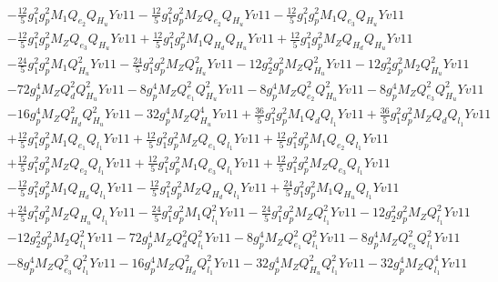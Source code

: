 \begin{align}
 &-\frac{12}{5} g_{1}^{2} g_{p}^{2} M_1 Q_{e_{2}} Q_{H_u} Yv11 -\frac{12}{5} g_{1}^{2} g_{p}^{2} M_Z Q_{e_{2}} Q_{H_u} Yv11 -\frac{12}{5} g_{1}^{2} g_{p}^{2} M_1 Q_{e_3} Q_{H_u} Yv11 \nonumber \\ 
 &-\frac{12}{5} g_{1}^{2} g_{p}^{2} M_Z Q_{e_3} Q_{H_u} Yv11 +\frac{12}{5} g_{1}^{2} g_{p}^{2} M_1 Q_{H_d} Q_{H_u} Yv11 +\frac{12}{5} g_{1}^{2} g_{p}^{2} M_Z Q_{H_d} Q_{H_u} Yv11 \nonumber \\ 
 &-\frac{24}{5} g_{1}^{2} g_{p}^{2} M_1 Q_{H_u}^{2} Yv11 -\frac{24}{5} g_{1}^{2} g_{p}^{2} M_Z Q_{H_u}^{2} Yv11 -12 g_{2}^{2} g_{p}^{2} M_Z Q_{H_u}^{2} Yv11 -12 g_{2}^{2} g_{p}^{2} M_2 Q_{H_u}^{2} Yv11 \nonumber \\ 
 &-72 g_{p}^{4} M_Z Q_{d}^{2} Q_{H_u}^{2} Yv11 -8 g_{p}^{4} M_Z Q_{e_{1}}^{2} Q_{H_u}^{2} Yv11 -8 g_{p}^{4} M_Z Q_{e_{2}}^{2} Q_{H_u}^{2} Yv11 -8 g_{p}^{4} M_Z Q_{e_3}^{2} Q_{H_u}^{2} Yv11 \nonumber \\ 
 &-16 g_{p}^{4} M_Z Q_{H_d}^{2} Q_{H_u}^{2} Yv11 -32 g_{p}^{4} M_Z Q_{H_u}^{4} Yv11 +\frac{36}{5} g_{1}^{2} g_{p}^{2} M_1 Q_{d} Q_{l_1} Yv11 +\frac{36}{5} g_{1}^{2} g_{p}^{2} M_Z Q_{d} Q_{l_1} Yv11 \nonumber \\ 
 &+\frac{12}{5} g_{1}^{2} g_{p}^{2} M_1 Q_{e_{1}} Q_{l_1} Yv11 +\frac{12}{5} g_{1}^{2} g_{p}^{2} M_Z Q_{e_{1}} Q_{l_1} Yv11 +\frac{12}{5} g_{1}^{2} g_{p}^{2} M_1 Q_{e_{2}} Q_{l_1} Yv11 \nonumber \\ 
 &+\frac{12}{5} g_{1}^{2} g_{p}^{2} M_Z Q_{e_{2}} Q_{l_1} Yv11 +\frac{12}{5} g_{1}^{2} g_{p}^{2} M_1 Q_{e_3} Q_{l_1} Yv11 +\frac{12}{5} g_{1}^{2} g_{p}^{2} M_Z Q_{e_3} Q_{l_1} Yv11 \nonumber \\ 
 &-\frac{12}{5} g_{1}^{2} g_{p}^{2} M_1 Q_{H_d} Q_{l_1} Yv11 -\frac{12}{5} g_{1}^{2} g_{p}^{2} M_Z Q_{H_d} Q_{l_1} Yv11 +\frac{24}{5} g_{1}^{2} g_{p}^{2} M_1 Q_{H_u} Q_{l_1} Yv11 \nonumber \\ 
 &+\frac{24}{5} g_{1}^{2} g_{p}^{2} M_Z Q_{H_u} Q_{l_1} Yv11 -\frac{24}{5} g_{1}^{2} g_{p}^{2} M_1 Q_{l_1}^{2} Yv11 -\frac{24}{5} g_{1}^{2} g_{p}^{2} M_Z Q_{l_1}^{2} Yv11 -12 g_{2}^{2} g_{p}^{2} M_Z Q_{l_1}^{2} Yv11 \nonumber \\ 
 &-12 g_{2}^{2} g_{p}^{2} M_2 Q_{l_1}^{2} Yv11 -72 g_{p}^{4} M_Z Q_{d}^{2} Q_{l_1}^{2} Yv11 -8 g_{p}^{4} M_Z Q_{e_{1}}^{2} Q_{l_1}^{2} Yv11 -8 g_{p}^{4} M_Z Q_{e_{2}}^{2} Q_{l_1}^{2} Yv11 \nonumber \\ 
 &-8 g_{p}^{4} M_Z Q_{e_3}^{2} Q_{l_1}^{2} Yv11 -16 g_{p}^{4} M_Z Q_{H_d}^{2} Q_{l_1}^{2} Yv11 -32 g_{p}^{4} M_Z Q_{H_u}^{2} Q_{l_1}^{2} Yv11 -32 g_{p}^{4} M_Z Q_{l_1}^{4} Yv11 \nonumber \\ 

\end{align}
